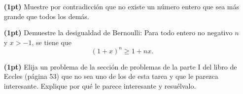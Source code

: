 \documentclass{article}
\begin{document}
\begin{itemize}
    \item[\bf (1pt)] Muestre por contradicción que no existe un número entero que sea más grande que todos los demás.
    \item[\bf (1pt)] Demuestre la desigualdad de Bernoulli: Para todo entero no negativo $n$ y $x > -1$, se tiene que
            $$ (1+x)^n \geq 1 + nx. $$
        \item[\bf (1pt)] Elija un problema de la sección de problemas de la parte I del libro de Eccles (página 53) que no sea uno de los de esta tarea y que le parezca interesante. Explique por qué le parece interesante y resuélvalo. 

\end{itemize} %

\vspace{1cm}
\end{document}
